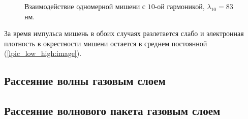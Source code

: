     \begin{figure}[htb]
        \hfil
        \caption{Взаимодействие одномерной мишени с $10$-ой гармоникой, $\lambda_{10} = 83$ нм.}\label{lpic_low_high:image}
    \end{figure}

За время импульса мишень в обоих случаях разлетается слабо и электронная плотность в окрестности мишени остается в среднем постоянной (\autoref{lpic_low_high:image}).

\subsection{Рассеяние волны газовым слоем}

\subsection{Рассеяние волнового пакета газовым слоем}